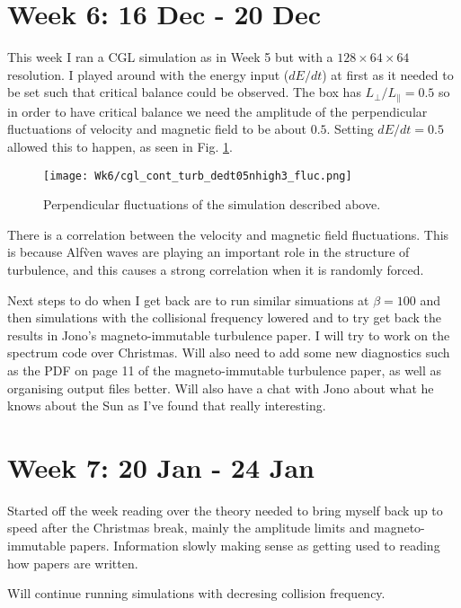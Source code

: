 \documentclass[12pt,letterpaper]{article}
\begin{document}
  \newpage
  \section*{Week 6: 16 Dec - 20 Dec}

  This week I ran a CGL simulation as in Week 5 but with a $128\times 64\times 64$ resolution. I played around with the energy input ($dE/dt$) at first as it needed to be set such that critical balance could be observed. The box has $L_\perp/L_\|=0.5$ so in order to have critical balance we need the amplitude of the perpendicular fluctuations of velocity and magnetic field to be about $0.5$. Setting $dE/dt=0.5$ allowed this to happen, as seen in Fig. \ref{fig:sim_fluc}.

  \begin{figure}[!h]
   \centering
  \texttt{[image: Wk6/cgl\_cont\_turb\_dedt05nhigh3\_fluc.png]}

  \caption{Perpendicular fluctuations of the simulation described above.}
  \label{fig:sim_fluc}
  \end{figure}

  There is a correlation between the velocity and magnetic field fluctuations. This is because Alf\`ven waves are playing an important role in the structure of turbulence, and this causes a strong correlation when it is randomly forced.

  Next steps to do when I get back are to run similar simuations at $\beta=100$ and then simulations with the collisional frequency lowered and to try get back the results in Jono's magneto-immutable turbulence paper. I will try to work on the spectrum code over Christmas. Will also need to add some new diagnostics such as the PDF on page 11 of the magneto-immutable turbulence paper, as well as organising output files better. Will also have a chat with Jono about what he knows about the Sun as I've found that really interesting.

  \newpage
  \section*{Week 7: 20 Jan - 24 Jan}

  Started off the week reading over the theory needed to bring myself back up to speed after the Christmas break, mainly the amplitude limits and magneto-immutable papers. Information slowly making sense as getting used to reading how papers are written.

  Will continue running simulations with decresing collision frequency.
\end{document}
